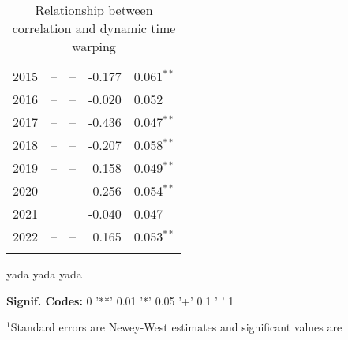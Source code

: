 \documentclass[12pt]{article}
\begin{document}
\begin{table}
\begin{tabular}{l r l r l}
        2015            &      -- &              -- &  -0.177 & 0.061{$^{**}$}  \\
        2016            &      -- &              -- &  -0.020 & 0.052           \\
        2017            &      -- &              -- &  -0.436 & 0.047{$^{**}$}  \\
        2018            &      -- &              -- &  -0.207 & 0.058{$^{**}$}  \\
        2019            &      -- &              -- &  -0.158 & 0.049{$^{**}$}  \\
        2020            &      -- &              -- &   0.256 & 0.054{$^{**}$}  \\
        2021            &      -- &              -- &  -0.040 & 0.047           \\
        2022            &      -- &              -- &   0.165 & 0.053{$^{**}$}  \\
        \vspace{-1mm} \\
    \end{tabular}
    \caption{Relationship between correlation and dynamic time warping}
    \begin{tablenotes}
        \item{\footnotesize yada yada yada}
        \item{\footnotesize \textbf{Signif. Codes:} 0 '**' 0.01 '*' 0.05 '+' 0.1 ' ' 1}
        \item{\footnotesize $^{1}$Standard errors are Newey-West estimates and significant values are } 
    \end{tablenotes}
    \label{tbl:correlation_to_log_dtw_regression}
\end{table}


\pagebreak
\end{document}
